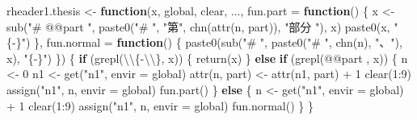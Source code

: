 \documentclass[
]{article}
\newenvironment{Shaded}{\begin{snugshade}}{\end{snugshade}}
\newcommand{\AttributeTok}[1]{\textcolor[rgb]{0.77,0.63,0.00}{#1}}
\newcommand{\ControlFlowTok}[1]{\textcolor[rgb]{0.13,0.29,0.53}{\textbf{#1}}}
\newcommand{\DecValTok}[1]{\textcolor[rgb]{0.00,0.00,0.81}{#1}}
\newcommand{\FunctionTok}[1]{\textcolor[rgb]{0.00,0.00,0.00}{#1}}
\newcommand{\NormalTok}[1]{#1}
\newcommand{\OtherTok}[1]{\textcolor[rgb]{0.56,0.35,0.01}{#1}}
\newcommand{\SpecialCharTok}[1]{\textcolor[rgb]{0.00,0.00,0.00}{#1}}
\newcommand{\StringTok}[1]{\textcolor[rgb]{0.31,0.60,0.02}{#1}}
\begin{document}
\begin{Shaded}
\begin{Highlighting}[]
\NormalTok{rheader1.thesis }\OtherTok{\textless{}{-}} \ControlFlowTok{function}\NormalTok{(x, global, clear, ...,}
  \AttributeTok{fun.part =} \ControlFlowTok{function}\NormalTok{() \{}
\NormalTok{    x }\OtherTok{\textless{}{-}} \FunctionTok{sub}\NormalTok{(}\StringTok{"\# @@part "}\NormalTok{, }\FunctionTok{paste0}\NormalTok{(}\StringTok{"\# "}\NormalTok{, }\StringTok{"第"}\NormalTok{, }\FunctionTok{chn}\NormalTok{(}\FunctionTok{attr}\NormalTok{(n, }\StringTok{\textquotesingle{}part\textquotesingle{}}\NormalTok{)), }\StringTok{"部分 "}\NormalTok{), x)}
    \FunctionTok{paste0}\NormalTok{(x, }\StringTok{" \{{-}\}"}\NormalTok{)}
\NormalTok{  \},}
  \AttributeTok{fun.normal =} \ControlFlowTok{function}\NormalTok{() \{}
    \FunctionTok{paste0}\NormalTok{(}\FunctionTok{sub}\NormalTok{(}\StringTok{"\# "}\NormalTok{, }\FunctionTok{paste0}\NormalTok{(}\StringTok{"\# "}\NormalTok{, }\FunctionTok{chn}\NormalTok{(n), }\StringTok{"、"}\NormalTok{), x), }\StringTok{"\{{-}\}"}\NormalTok{)}
\NormalTok{  \})}
\NormalTok{\{}
  \ControlFlowTok{if}\NormalTok{ (}\FunctionTok{grepl}\NormalTok{(}\StringTok{\textquotesingle{}}\SpecialCharTok{\textbackslash{}\textbackslash{}}\StringTok{\{{-}}\SpecialCharTok{\textbackslash{}\textbackslash{}}\StringTok{\}\textquotesingle{}}\NormalTok{, x)) \{}
    \FunctionTok{return}\NormalTok{(x)}
\NormalTok{  \} }\ControlFlowTok{else} \ControlFlowTok{if}\NormalTok{ (}\FunctionTok{grepl}\NormalTok{(}\StringTok{\textquotesingle{}@@part \textquotesingle{}}\NormalTok{, x)) \{}
\NormalTok{    n }\OtherTok{\textless{}{-}} \DecValTok{0}
\NormalTok{    n1 }\OtherTok{\textless{}{-}} \FunctionTok{get}\NormalTok{(}\StringTok{"n1"}\NormalTok{, }\AttributeTok{envir =}\NormalTok{ global)}
    \FunctionTok{attr}\NormalTok{(n, }\StringTok{\textquotesingle{}part\textquotesingle{}}\NormalTok{) }\OtherTok{\textless{}{-}} \FunctionTok{attr}\NormalTok{(n1, }\StringTok{\textquotesingle{}part\textquotesingle{}}\NormalTok{) }\SpecialCharTok{+} \DecValTok{1}
    \FunctionTok{clear}\NormalTok{(}\DecValTok{1}\SpecialCharTok{:}\DecValTok{9}\NormalTok{)}
    \FunctionTok{assign}\NormalTok{(}\StringTok{"n1"}\NormalTok{, n, }\AttributeTok{envir =}\NormalTok{ global)}
    \FunctionTok{fun.part}\NormalTok{()}
\NormalTok{  \} }\ControlFlowTok{else}\NormalTok{ \{}
\NormalTok{    n }\OtherTok{\textless{}{-}} \FunctionTok{get}\NormalTok{(}\StringTok{"n1"}\NormalTok{, }\AttributeTok{envir =}\NormalTok{ global) }\SpecialCharTok{+} \DecValTok{1}
    \FunctionTok{clear}\NormalTok{(}\DecValTok{1}\SpecialCharTok{:}\DecValTok{9}\NormalTok{)}
    \FunctionTok{assign}\NormalTok{(}\StringTok{"n1"}\NormalTok{, n, }\AttributeTok{envir =}\NormalTok{ global)}
    \FunctionTok{fun.normal}\NormalTok{()}
\NormalTok{  \}}
\NormalTok{\}}


\end{Highlighting}
\end{Shaded}
\end{document}
